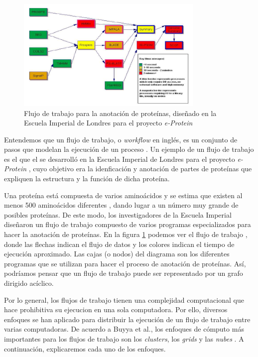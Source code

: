 \documentclass[letterpaper]{report}
\begin{document}
\begin{figure}
    \begin{center}
        \includegraphics[width=0.8\textwidth]{imagenes/iceni-workflow}
    \end{center}
    \caption{Flujo de trabajo para la anotación de proteínas, diseñado en la Escuela Imperial de Londres para el proyecto \emph{e-Protein}}
    \label{fig:iceni-workflow}
\end{figure}

Entendemos que un flujo de trabajo, o \emph{workflow} en inglés, es un conjunto de pasos que modelan la ejecución de un proceso \cite{gutierrez2012agent}. Un ejemplo de un flujo de trabajo es el que el se desarrolló en la Escuela Imperial de Londres para el proyecto \emph{e-Protein} \cite{o2004mapping}, cuyo objetivo era la idenficación y anotación de partes de proteínas que expliquen la estructura y la función de dicha proteína.

Una proteína está compuesta de varios aminoácidos y se estima que existen al menos 500 aminoácidos diferentes \cite{wagner1983new}, dando lugar a un número muy grande de posibles proteínas. De este modo, los investigadores de la Escuela Imperial diseñaron un flujo de trabajo compuesto de varios programas especializados para hacer la anotación de proteínas. En la figura \ref{fig:iceni-workflow} podemos ver el flujo de trabajo \cite{o2004mapping}, donde las flechas indican el flujo de datos y los colores indican el tiempo de ejecución aproximado. Las cajas (o nodos) del diagrama son los diferentes programas que se utilizan para hacer el proceso de anotación de proteínas. Así, podríamos pensar que un flujo de trabajo puede ser representado por un grafo dirigido acíclico.

Por lo general, los flujos de trabajo tienen una complejidad computacional que hace prohibitiva su ejecucion en una sola computadora. Por ello, diversos enfoques se han aplicado para distribuir la ejecución de un flujo de trabajo entre varias computadoras.  De acuerdo a Buyya et al., los enfoques de cómputo más importantes para los flujos de trabajo son los \emph{clusters}, los \emph{grids} y las \emph{nubes} \cite{buyya2009cloud}. A continuación, explicaremos cada uno de los enfoques.
\end{document}
